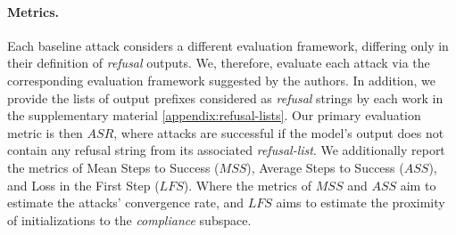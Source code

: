 
\paragraph{Metrics.}
Each baseline attack considers a different evaluation framework, differing only in their definition of \emph{refusal} outputs. We, therefore, evaluate each attack via the corresponding evaluation framework suggested by the authors. In addition, we provide the lists of output prefixes considered as \emph{refusal} strings by each work in the supplementary material \cref{appendix:refusal-lists}. Our primary evaluation metric is then $ASR$, where attacks are successful if the model’s output does not contain any refusal string from its associated \textit{refusal-list}. We additionally report the metrics of Mean Steps to Success ($MSS$), Average Steps to Success ($ASS$), and Loss in the First Step ($LFS$). Where the metrics of $MSS$ and $ASS$ aim to estimate the attacks' convergence rate, and $LFS$ aims to estimate the proximity of initializations to the \emph{compliance} subspace. 













